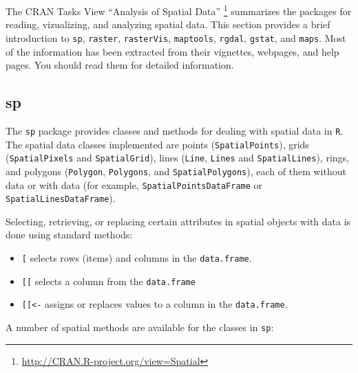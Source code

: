\documentclass[smallroyalvopaper]{memoir}
\begin{document}
The CRAN Tasks View ``Analysis of Spatial Data'' \footnote{\url{http://CRAN.R-project.org/view=Spatial}} summarizes the packages for reading, vizualizing, and analyzing spatial data. This section provides a brief introduction to \texttt{sp}, \texttt{raster}, \texttt{rasterVis}, \texttt{maptools}, \texttt{rgdal}, \texttt{gstat}, and \texttt{maps}. Most of the information has been extracted from their vignettes, webpages, and help pages. You should read them for detailed information.

\subsection{sp}
\label{sec:orgheadline24}
\label{sec:sp}


The \texttt{sp} package \cite{Pebesma.Bivand2005} provides classes and methods for dealing with spatial data in \texttt{R}. The spatial data classes implemented are points (\texttt{SpatialPoints}), grids (\texttt{SpatialPixels} and \texttt{SpatialGrid}), lines (\texttt{Line}, \texttt{Lines} and \texttt{SpatialLines}), rings, and polygons (\texttt{Polygon}, \texttt{Polygons}, and \texttt{SpatialPolygons}), each of them without data or with data (for example, \texttt{SpatialPointsDataFrame} or \texttt{SpatialLinesDataFrame}).

Selecting, retrieving, or replacing certain attributes in spatial objects with data is done using standard methods:

\begin{itemize}
\item \texttt{[} selects rows (items) and columns in the \texttt{data.frame}.

\item \texttt{[[} selects a column from the \texttt{data.frame}

\item \texttt{[[<-} assigns or replaces values to a column in the \texttt{data.frame}.
\end{itemize}

A number of spatial methods are available for the classes in \texttt{sp}:
\end{document}

